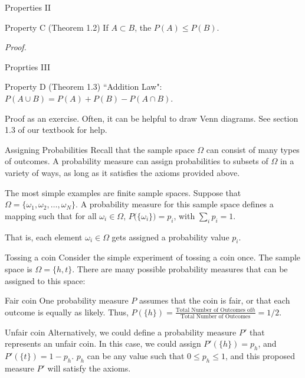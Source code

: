 \begin{frame}{Properties II}
  \begin{block}{Property C (Theorem 1.2)}
    If $A \subset B$, the $P(A) \leq P(B)$.
  \end{block}
  \emph{Proof.}
\end{frame}

\begin{frame}{Proprties III}
  \begin{block}{Property D (Theorem 1.3)}
    ``Addition Law": $P(A \cup B) = P(A) + P(B) - P(A \cap B)$.
  \end{block}
  Proof as an exercise. Often, it can be helpful to draw Venn diagrams. See section 1.3 of our textbook for help.
\end{frame}

\begin{frame}{Assigning Probabilities}
  Recall that the sample space $\Omega$ can consist of many types of outcomes. A probability measure can assign probabilities to subsets of $\Omega$ in a variety of ways, as long as it satisfies the axioms provided above.
  
  The most simple examples are finite sample spaces.
  Suppose that $\Omega = \{\omega_1, \omega_2, \ldots, \omega_N\}$.
  A probability measure for this sample space defines a mapping such that for all $\omega_i \in \Omega$, $P\big(\{\omega_i\}\big) = p_i$, with $\sum_i p_i = 1$.
  
  That is, each element $\omega_i \in \Omega$ gets assigned a probability value $p_i$.
  
\end{frame}

\begin{frame}{Tossing a coin}
  Consider the simple experiment of tossing a coin once. The sample space is $\Omega = \{h, t\}$. There are many possible probability measures that can be assigned to this space:
  \begin{exampleblock}{Fair coin}
    One probability measure $P$ assumes that the coin is fair, or that each outcome is equally as likely.
    Thus, $P(\{h\}) = \frac{\text{Total Number of Outcomes of} h}{\text{Total Number of Outcomes}} = 1/2$.
  \end{exampleblock}
  
  \begin{exampleblock}{Unfair coin}
    Alternatively, we could define a probability measure $P'$ that represents an unfair coin. In this case, we could assign $P'(\{h\}) = p_h$, and $P'(\{t\}) = 1 - p_h$. $p_h$ can be any value such that $0 \leq p_h \leq 1$, and this proposed measure $P'$ will satisfy the axioms.
  \end{exampleblock}
\end{frame}


